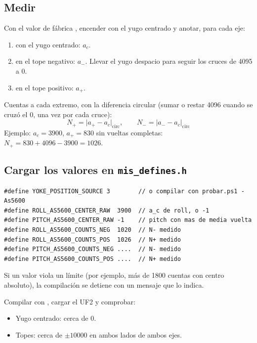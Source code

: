 \documentclass[11pt,a4paper]{article}
\newcommand{\code}[1]{\texttt{\detokenize{#1}}}
\newcommand{\casilla}{$\square$\ }
\begin{document}
\subsection{Medir}
Con el valor de fábrica \code{-1}, encender con el yugo centrado y anotar, para cada eje:
\begin{enumerate}
\item \code{a=} con el yugo centrado: \(a_c\).
\item \code{a=} en el tope negativo: \(a_-\). Llevar el yugo despacio para seguir los cruces de 4095 a 0.
\item \code{a=} en el tope positivo: \(a_+\).
\end{enumerate}
Cuentas a cada extremo, con la diferencia circular (sumar o restar 4096 cuando se cruzó el 0, una vez por cada cruce):
\[
N_+ = \lvert a_+ - a_c \rvert_{\text{circ}}, \qquad N_- = \lvert a_- - a_c \rvert_{\text{circ}}
\]
Ejemplo: \(a_c = 3900\), \(a_+ = 830\) sin vueltas completas: \(N_+ = 830 + 4096 - 3900 = 1026\).

\subsection{Cargar los valores en \texttt{mis\_defines.h}}
\begin{lstlisting}
#define YOKE_POSITION_SOURCE 3        // o compilar con probar.ps1 -As5600
#define ROLL_AS5600_CENTER_RAW  3900  // a_c de roll, o -1
#define PITCH_AS5600_CENTER_RAW -1    // pitch con mas de media vuelta
#define ROLL_AS5600_COUNTS_NEG  1020  // N- medido
#define ROLL_AS5600_COUNTS_POS  1026  // N+ medido
#define PITCH_AS5600_COUNTS_NEG ....  // N- medido
#define PITCH_AS5600_COUNTS_POS ....  // N+ medido
\end{lstlisting}
Si un valor viola un límite (por ejemplo, más de 1800 cuentas con centro absoluto), la compilación se detiene con un mensaje que lo indica.

Compilar con \code{probar.ps1 -As5600}, cargar el UF2 y comprobar:
\begin{itemize}
\item[\casilla] Yugo centrado: \code{x=} cerca de 0.
\item[\casilla] Topes: \code{x=} cerca de \(\pm 10000\) en ambos lados de ambos ejes.
\end{itemize}
\end{document}
